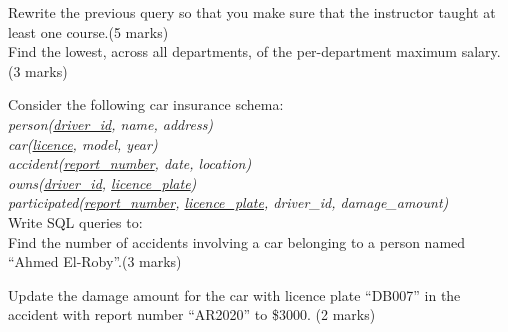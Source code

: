 \documentclass[a4 paper]{article}
\begin{document}
 Rewrite the previous query so that you make sure that the instructor taught at least one course.\indent (5 marks)\\


 Find the lowest, across all departments, of the per-department maximum salary.\indent (3 marks)


Consider the following car insurance schema:\\
\emph{person(\underline{driver\_id}, name, address)}\\
\emph{car(\underline{licence}, model, year)}\\
\emph{accident(\underline{report\_number}, date, location)}\\
\emph{owns(\underline{driver\_id}, \underline{licence\_plate})}\\
\emph{participated(\underline{report\_number}, \underline{licence\_plate}, driver\_id, damage\_amount)}\\
Write SQL queries to:\\
 Find the number of accidents involving a car belonging to a person named ``Ahmed El-Roby''.\indent (3 marks)


 Update the damage amount for the car with licence plate ``DB007'' in the accident with report number ``AR2020'' to \$3000. \indent (2 marks)
\end{document}
